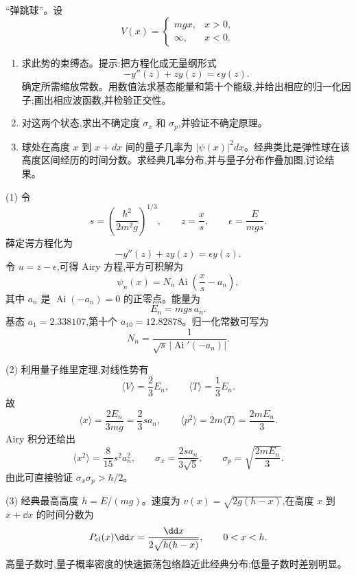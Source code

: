 \begin{question}
“弹跳球”。设
\[
V(x)=\begin{cases}mgx,&x>0,\\ \infty,&x<0.
\end{cases}
\]
\begin{enumerate}
\item 求此势的束缚态。提示:把方程化成无量纲形式
\[
-y''(z)+zy(z)=\epsilon y(z).
\]
确定所需缩放常数。用数值法求基态能量和第十个能级,并给出相应的归一化因子;画出相应波函数,并检验正交性。
\item 对这两个状态,求出不确定度 $\sigma_x$ 和 $\sigma_p$,并验证不确定原理。
\item 球处在高度 $x$ 到 $x+dx$ 间的量子几率为 $|\psi(x)|^2dx$。经典类比是弹性球在该高度区间经历的时间分数。求经典几率分布,并与量子分布作叠加图,讨论结果。
\end{enumerate}
\end{question}
\begin{solution}
(1) 令
\[
s=\left(\frac{\hbar^2}{2m^2g}\right)^{1/3},
\qquad
z=\frac{x}{s},
\qquad
\epsilon=\frac{E}{mgs}.
\]
薛定谔方程化为
\[
-y''(z)+zy(z)=\epsilon y(z).
\]
令 $u=z-\epsilon$,可得 Airy 方程,平方可积解为
\[
\psi_n(x)=N_n\operatorname{Ai}\left(\frac{x}{s}-a_n\right),
\]
其中 $a_n$ 是 $\operatorname{Ai}(-a_n)=0$ 的正零点。能量为
\[
E_n=mgs\,a_n.
\]
基态 $a_1=2.338107$,第十个 $a_{10}=12.82878$。归一化常数可写为
\[
N_n=\frac1{\sqrt{s}\,|\operatorname{Ai}'(-a_n)|}.
\]

(2) 利用量子维里定理,对线性势有
\[
\langle V\rangle=\frac23E_n,
\qquad
\langle T\rangle=\frac13E_n.
\]
故
\[
\langle x\rangle=\frac{2E_n}{3mg}=\frac23sa_n,
\qquad
\langle p^2\rangle=2m\langle T\rangle=\frac{2mE_n}{3}.
\]
Airy 积分还给出
\[
\langle x^2\rangle=\frac{8}{15}s^2a_n^2,
\qquad
\sigma_x=\frac{2sa_n}{3\sqrt5},
\qquad
\sigma_p=\sqrt{\frac{2mE_n}{3}}.
\]
由此可直接验证 $\sigma_x\sigma_p>\hbar/2$。

(3) 经典最高高度 $h=E/(mg)$。速度为 $v(x)=\sqrt{2g(h-x)}$,在高度 $x$ 到 $x+\dd x$ 的时间分数为
\[
P_{\rm cl}(x)\dd x=\frac{\dd x}{2\sqrt{h(h-x)}},
\qquad 0<x<h.
\]
高量子数时,量子概率密度的快速振荡包络趋近此经典分布;低量子数时差别明显。
\end{solution}

